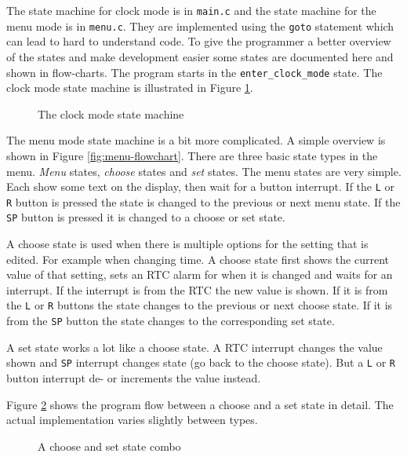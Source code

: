 \documentclass{awac02}
\begin{document}
The state machine for clock mode is in \texttt{main.c} and the state machine
for the menu mode is in \texttt{menu.c}. They are implemented using the
\texttt{goto} statement which can lead to hard to understand code.  To give the
programmer a better overview of the states and make development easier some
states are documented here and shown in flow-charts. The program starts in the
\texttt{enter\_clock\_mode} state. The clock mode state machine is illustrated
in Figure \ref{fig:clock-state}.

\begin{figure}[h]
    \centering
    
    \caption{The clock mode state machine}
    \label{fig:clock-state}
\end{figure}

The menu mode state machine is a bit more complicated. A simple overview is
shown in Figure \ref{fig:menu-flowchart}. There are three basic state types in the
menu. \emph{Menu} states, \emph{choose} states and \emph{set} states. The menu
states are very simple. Each show some text on the display, then wait for a
button interrupt. If the \texttt{L} or \texttt{R} button is pressed the
state is changed to the previous or next menu state. If the \texttt{SP} button
is pressed it is changed to a choose or set state.

A choose state is used when there is multiple options for the setting that is
edited. For example when changing time. A choose state first shows the current
value of that setting, sets an RTC alarm for when it is changed and waits for
an interrupt. If the interrupt is from the RTC the new value is shown. If it is
from the \texttt{L} or \texttt{R} buttons the state changes to the previous or
next choose state. If it is from the \texttt{SP} button the state changes to
the corresponding set state.

A set state works a lot like a choose state. A RTC interrupt changes the value
shown and \texttt{SP} interrupt changes state (go back to the choose state).
But a \texttt{L} or \texttt{R} button interrupt de- or increments the value
instead.

Figure \ref{fig:choose-and-set-state} shows the program flow between a choose
and a set state in detail. The actual implementation varies slightly
between types.

\begin{figure}[h]
    \centering
    
    \caption{A choose and set state combo}
    \label{fig:choose-and-set-state}
\end{figure}
\end{document}
